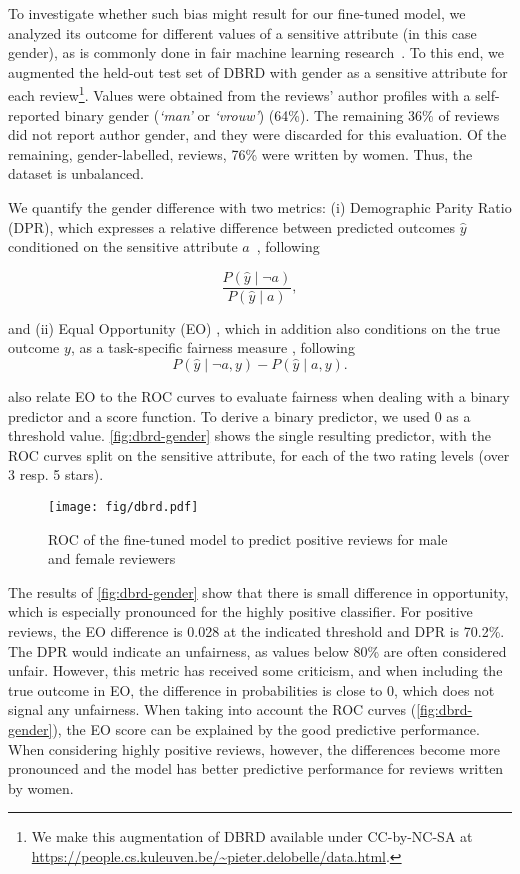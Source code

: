 \documentclass[11pt,a4paper]{article}
\begin{document}
To investigate whether such bias might result for our fine-tuned model, we analyzed its outcome for different values of a sensitive attribute (in this case gender), as is commonly done in fair machine learning research~\citep{zemel2013learning, hardtEqualityOpportunitySupervised2016, delobelleEthical2020}.
To this end, we augmented the held-out test set of DBRD with gender as a sensitive attribute for each review\footnote{We make this augmentation of DBRD available under CC-by-NC-SA at \url{https://people.cs.kuleuven.be/~pieter.delobelle/data.html}.}.
Values were obtained from the reviews' author profiles with a self-reported binary gender (\emph{`man'} or \emph{`vrouw'}) (64\%). The remaining 36\% of reviews did not report 
author
gender, and they were discarded for this evaluation.
Of the remaining, gender-labelled, reviews, 76\% were written by women.
Thus, the dataset is unbalanced.

We quantify the gender difference with two metrics: (i) Demographic Parity Ratio (DPR), which expresses a relative difference between predicted outcomes $\hat{y}$ conditioned on the sensitive attribute $a$~\citep{dworkFairnessAwareness2012}, following

\[
\frac{P( \hat{y} \mid \neg a)}{P( \hat{y} \mid a)},
\]

and (ii) Equal Opportunity (EO) \citet{hardtEqualityOpportunitySupervised2016}, 
which in addition also conditions on the true outcome $y$,
as a task-specific fairness
measure \citep{dworkFairnessAwareness2012}, following 
\[
P( \hat{y} \mid \neg a, y) - P( \hat{y} \mid a, y).
\]

\citet{hardtEqualityOpportunitySupervised2016} also relate EO to the ROC curves to evaluate fairness when dealing with a binary predictor and a score function.
To derive a binary predictor, 
we used 0 as a threshold value. \autoref{fig:dbrd-gender} shows the single resulting predictor, with the ROC curves split on the sensitive attribute, for each of the two rating levels (over 3 resp. 5 stars). 


\begin{figure}[t]
    \centering
    \texttt{[image: fig/dbrd.pdf]}
    \caption{ROC of the fine-tuned model to predict positive reviews for male and female reviewers}
    \label{fig:dbrd-gender}
\end{figure}


The results of \autoref{fig:dbrd-gender} show that there is small difference in opportunity,
which is especially pronounced for the highly positive classifier.
For positive reviews, the EO difference is 0.028 at the indicated threshold and DPR is 70.2\%.
The DPR would indicate an 
unfairness, as values below 80\% are often considered unfair.
However, this metric has received some 
criticism,
and when including the true outcome in EO, the difference in probabilities is close to 0,
which does not signal any unfairness.
When taking into account the ROC curves (\autoref{fig:dbrd-gender}), the EO score can be explained by the good predictive performance. 
When considering highly positive reviews, however, the differences become more pronounced and the model has better predictive performance for reviews written by women. 
\end{document}

